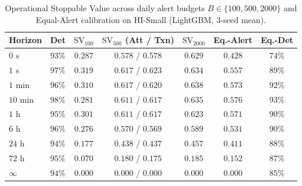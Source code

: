 \documentclass[sigconf,nonacm]{acmart}
\begin{document}
\begin{table}[t]
\centering
\caption{Operational Stoppable Value across daily alert budgets $B \in \{100, 500, 2000\}$ and Equal-Alert calibration on HI-Small (LightGBM, 3-seed mean).}
\label{tab:sv_budgets}
\scriptsize
\setlength{\tabcolsep}{2.5pt}
\begin{tabular}{lcccccc}
\toprule
\textbf{Horizon} & \textbf{Det} & \textbf{$\text{SV}_{100}$} & \textbf{$\text{SV}_{500}$ (Att / Txn)} & \textbf{$\text{SV}_{2000}$} & \textbf{Eq.-Alert} & \textbf{Eq.-Det} \\
\midrule
$0\text{ s}$ & $93\%$ & $0.287$ & $0.578$ / $0.578$ & $0.629$ & $0.428$ & $74\%$ \\
$1\text{ s}$ & $97\%$ & $0.319$ & $0.617$ / $0.623$ & $0.634$ & $0.557$ & $89\%$ \\
$1\text{ min}$ & $96\%$ & $0.310$ & $0.617$ / $0.620$ & $0.638$ & $0.573$ & $92\%$ \\
$10\text{ min}$ & $98\%$ & $0.281$ & $0.611$ / $0.617$ & $0.635$ & $0.576$ & $93\%$ \\
$1\text{ h}$ & $95\%$ & $0.301$ & $0.611$ / $0.617$ & $0.623$ & $0.571$ & $90\%$ \\
$6\text{ h}$ & $96\%$ & $0.276$ & $0.570$ / $0.569$ & $0.589$ & $0.531$ & $90\%$ \\
$24\text{ h}$ & $94\%$ & $0.177$ & $0.438$ / $0.437$ & $0.457$ & $0.411$ & $88\%$ \\
$72\text{ h}$ & $95\%$ & $0.070$ & $0.180$ / $0.175$ & $0.185$ & $0.152$ & $87\%$ \\
$\infty$ & $94\%$ & $0.000$ & $0.000$ / $0.000$ & $0.000$ & $0.000$ & $85\%$ \\
\bottomrule
\end{tabular}
\end{table}
\end{document}
